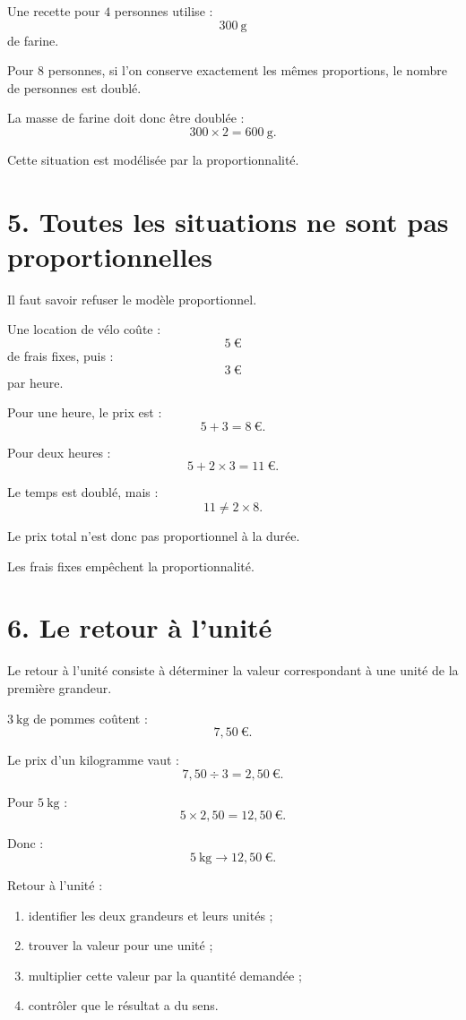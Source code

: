 Une recette pour $4$ personnes utilise :
\[
300\ \text{g}
\]
de farine.

Pour $8$ personnes, si l'on conserve exactement les mêmes proportions, le nombre de personnes est doublé.

La masse de farine doit donc être doublée :
\[
300\times2=600\ \text{g}.
\]

Cette situation est modélisée par la proportionnalité.

\section{5. Toutes les situations ne sont pas proportionnelles}

Il faut savoir refuser le modèle proportionnel.

\begin{exemple}
Une location de vélo coûte :
\[
5\ \text{€}
\]
de frais fixes, puis :
\[
3\ \text{€}
\]
par heure.

Pour une heure, le prix est :
\[
5+3=8\ \text{€}.
\]

Pour deux heures :
\[
5+2\times3=11\ \text{€}.
\]

Le temps est doublé, mais :
\[
11\neq2\times8.
\]

Le prix total n'est donc pas proportionnel à la durée.
\end{exemple}

Les frais fixes empêchent la proportionnalité.

\section{6. Le retour à l'unité}

Le retour à l'unité consiste à déterminer la valeur correspondant à une unité de la première grandeur.

\begin{exemple}
$3\ \text{kg}$ de pommes coûtent :
\[
7{,}50\ \text{€}.
\]

Le prix d'un kilogramme vaut :
\[
7{,}50\div3=2{,}50\ \text{€}.
\]

Pour $5\ \text{kg}$ :
\[
5\times2{,}50=12{,}50\ \text{€}.
\]

Donc :
\[
\boxed{5\ \text{kg}\longrightarrow12{,}50\ \text{€}}.
\]
\end{exemple}

\begin{methode}
Retour à l'unité :
\begin{enumerate}
\item identifier les deux grandeurs et leurs unités ;
\item trouver la valeur pour une unité ;
\item multiplier cette valeur par la quantité demandée ;
\item contrôler que le résultat a du sens.
\end{enumerate}
\end{methode}

